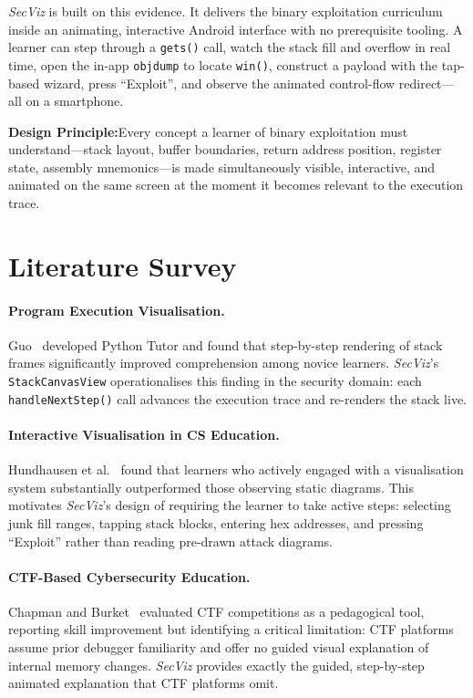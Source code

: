 \documentclass[12pt,a4paper]{article}
\newcommand{\SV}{\textit{SecViz}}
\begin{document}
\SV{} is built on this evidence. It delivers the binary exploitation curriculum
inside an animating, interactive Android interface with no prerequisite tooling.
A learner can step through a \texttt{gets()} call, watch the stack fill and
overflow in real time, open the in-app \texttt{objdump} to locate \texttt{win()},
construct a payload with the tap-based wizard, press ``Exploit'', and observe the
animated control-flow redirect---all on a smartphone.

\begin{infobox}
\textbf{Design Principle:}\quad Every concept a learner of binary exploitation must
understand---stack layout, buffer boundaries, return address position, register state,
assembly mnemonics---is made simultaneously visible, interactive, and animated on the
same screen at the moment it becomes relevant to the execution trace.
\end{infobox}

\section{Literature Survey}

\paragraph{Program Execution Visualisation.}
Guo~\cite{guo2013} developed Python Tutor and found that step-by-step rendering of
stack frames significantly improved comprehension among novice learners. \SV{}'s
\texttt{StackCanvasView} operationalises this finding in the security domain: each
\texttt{handleNextStep()} call advances the execution trace and re-renders the
stack live.

\paragraph{Interactive Visualisation in CS Education.}
Hundhausen et al.~\cite{hundhausen2002} found that learners who actively engaged
with a visualisation system substantially outperformed those observing static
diagrams. This motivates \SV{}'s design of requiring the learner to take active
steps: selecting junk fill ranges, tapping stack blocks, entering hex addresses,
and pressing ``Exploit'' rather than reading pre-drawn attack diagrams.

\paragraph{CTF-Based Cybersecurity Education.}
Chapman and Burket~\cite{chapmanburket2016} evaluated CTF competitions as a
pedagogical tool, reporting skill improvement but identifying a critical limitation:
CTF platforms assume prior debugger familiarity and offer no guided visual
explanation of internal memory changes. \SV{} provides exactly the guided,
step-by-step animated explanation that CTF platforms omit.
\end{document}
